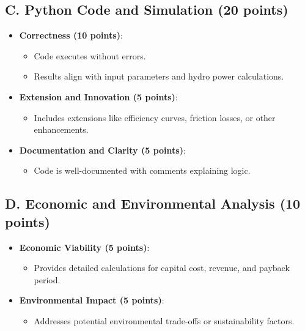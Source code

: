 \documentclass[11pt]{article}
\begin{document}
\subsection*{C. Python Code and Simulation (20 points)}
\begin{itemize}
    \item \textbf{Correctness (10 points)}:
    \begin{itemize}
        \item Code executes without errors.
        \item Results align with input parameters and hydro power calculations.
    \end{itemize}
    \item \textbf{Extension and Innovation (5 points)}:
    \begin{itemize}
        \item Includes extensions like efficiency curves, friction losses, or other enhancements.
    \end{itemize}
    \item \textbf{Documentation and Clarity (5 points)}:
    \begin{itemize}
        \item Code is well-documented with comments explaining logic.
    \end{itemize}
\end{itemize}

\subsection*{D. Economic and Environmental Analysis (10 points)}
\begin{itemize}
    \item \textbf{Economic Viability (5 points)}:
    \begin{itemize}
        \item Provides detailed calculations for capital cost, revenue, and payback period.
    \end{itemize}
    \item \textbf{Environmental Impact (5 points)}:
    \begin{itemize}
        \item Addresses potential environmental trade-offs or sustainability factors.
    \end{itemize}
\end{itemize}
\end{document}
